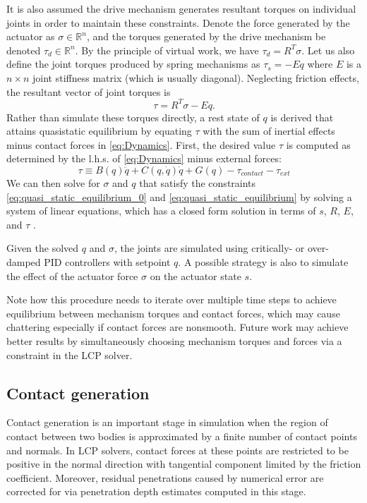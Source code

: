 It is also assumed the drive mechanism generates resultant torques on individual joints in order to maintain these constraints.  Denote the force generated by the actuator as $\sigma \in \mathbb{R}^n$, and the torques generated by the drive mechanism be denoted $\tau_{d} \in \mathbb{R}^n$. By the principle of virtual work, we have $\tau_{d} = R^T \sigma$.  Let us also define the joint torques produced by spring mechanisms as $\tau_{s} = - E q$ where $E$ is a $n \times n$ joint stiffness matrix (which is usually diagonal).  Neglecting friction effects, the resultant vector of joint torques is
\begin{equation}
\label{eq:quasi_static_equilibrium}
\tau = R^T\sigma - E q.
\end{equation}
Rather than simulate these torques directly, a rest state of $q$ is derived that attains quasistatic equilibrium by equating $\tau$ with the sum of inertial effects minus contact forces in \eqref{eq:Dynamics}. First, the desired value $\tau$ is computed as determined by the l.h.s. of \eqref{eq:Dynamics} minus external forces:
\begin{equation}
\tau \equiv B(q)\ddot{q} + C(q,\dot{q})\dot{q} + G(q) - \tau_{contact} - \tau_{ext}
\end{equation}
We can then solve for $\sigma$ and $q$ that satisfy the constraints \eqref{eq:quasi_static_equilibrium_0} and \eqref{eq:quasi_static_equilibrium} by solving a system of linear equations, which has a closed form solution in terms of $s$, $R$, $E$, and $\tau$ \cite{Grioli12}.

Given the solved $q$ and $\sigma$, the joints are simulated using critically- or over-damped PID controllers with setpoint $q$.  A possible strategy is also to simulate the effect of the actuator force $\sigma$ on the actuator state $s$.

Note how this procedure needs to iterate over multiple time steps to achieve equilibrium between mechanism torques and contact forces, which may cause chattering especially if contact forces are nonsmooth. Future work may achieve better results by simultaneously choosing mechanism torques and forces via a constraint in the LCP solver. 

\subsection{Contact generation}
Contact generation is an important stage in simulation when the region of contact between two bodies is approximated by a finite number of contact points and normals. In LCP solvers, contact forces at these points are restricted to be positive in the normal direction with tangential component limited by the friction coefficient. Moreover, residual penetrations caused by numerical error are corrected for via penetration depth estimates computed in this stage.

